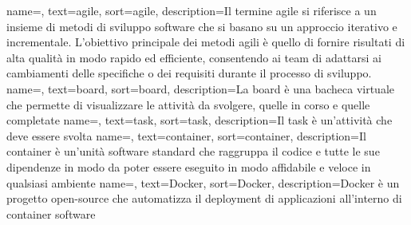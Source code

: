 {
    name=,
    text=agile,
    sort=agile,
    description={Il termine agile si riferisce a un insieme di metodi di sviluppo software che si basano su un approccio iterativo e incrementale. 
    L'obiettivo principale dei metodi agili è quello di fornire risultati di alta qualità in modo rapido ed efficiente, consentendo ai team di adattarsi ai cambiamenti delle specifiche o dei requisiti durante il processo di sviluppo.}
}
{
    name=,
    text=board,
    sort=board,
    description={La board è una bacheca virtuale che permette di visualizzare le attività da svolgere, quelle in corso e quelle completate}
}
{
    name=,
    text=task,
    sort=task,
    description={Il task è un'attività che deve essere svolta}
}
{
    name=,
    text=container,
    sort=container,
    description={Il container è un'unità software standard che raggruppa il codice e tutte le sue dipendenze in modo da poter essere eseguito in modo affidabile e veloce in qualsiasi ambiente}
}
{
    name=,
    text=Docker,
    sort=Docker,
    description={Docker è un progetto open-source che automatizza il deployment di applicazioni all'interno di container software}
}


